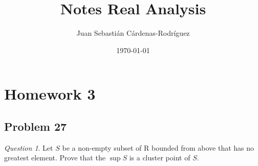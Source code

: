 \documentclass[11pt]{article}
\title{Notes Real Analysis}
\author{Juan Sebasti\'an C\'ardenas-Rodríguez \\ \scalebox{0.7}{Mathematical Engineering, Universidad EAFIT}}
\date{\today}
\theoremstyle{definition}
\theoremstyle{remark}
\theoremstyle{remark}
\newtheorem{question}{Question}
\begin{document}
\maketitle

\section{Homework 3}
\subsection{Problem 27}
\begin{question}
  Let $S$ be a non-empty subset of R bounded from above that has no
  greatest element. Prove that the $\sup S$ is a cluster point
  of $S$.
\end{question}
\end{document}
